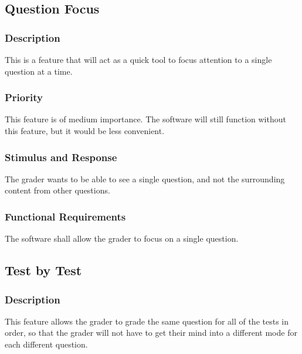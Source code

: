 
\subsection{Question Focus}
\subsubsection{Description}
This is a feature that will act as a quick tool to focus attention to a single question at a time.

\subsubsection{Priority}
This feature is of medium importance. The software will still function without this feature, but it would be less convenient.

\subsubsection{Stimulus and Response}
The grader wants to be able to see a single question, and not the surrounding content from other questions.

\subsubsection{Functional Requirements}
The software shall allow the grader to focus on a single question.


\subsection{Test by Test}
\subsubsection{Description}
This feature allows the grader to grade the same question for all of the tests in order, so that the grader will not have to get their mind into a different mode for each different question.

